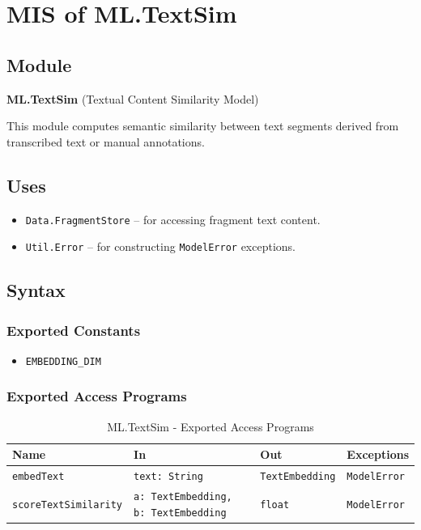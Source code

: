 \documentclass[12pt, titlepage]{article}
\begin{document}
\section{MIS of ML.TextSim} \label{ML.TextSim}

\subsection{Module}
\textbf{ML.TextSim} \; (Textual Content Similarity Model)

This module computes semantic similarity between text segments derived from transcribed text or manual annotations.

\subsection{Uses}
\begin{itemize}
    \item \texttt{Data.FragmentStore} – for accessing fragment text content.
    \item \texttt{Util.Error} – for constructing \texttt{ModelError} exceptions.
\end{itemize}

\subsection{Syntax}

\subsubsection{Exported Constants}
\begin{itemize}
    \item \texttt{EMBEDDING\_DIM}
\end{itemize}

\subsubsection{Exported Access Programs}

\begin{table}[H]
\centering
\small
\caption{ML.TextSim - Exported Access Programs}
\begin{tabular}{p{3.8cm} p{4.5cm} p{2.5cm} p{3.2cm}}
\toprule
\textbf{Name} & \textbf{In} & \textbf{Out} & \textbf{Exceptions} \\
\midrule
\texttt{embedText} & \texttt{text: String} & \texttt{TextEmbedding} & \texttt{ModelError} \\
\texttt{scoreTextSimilarity} & \texttt{a: TextEmbedding, b: TextEmbedding} & \texttt{float} & \texttt{ModelError} \\
\bottomrule
\end{tabular}
\end{table}
\end{document}
